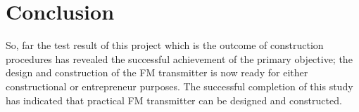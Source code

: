\chapter{Conclusion}

So, far the test result of this project which is the outcome of construction procedures has revealed the successful achievement of the primary objective; the design and construction of the FM transmitter is now ready for either constructional or entrepreneur purposes. The successful completion of this study has indicated that practical  FM transmitter can be designed and constructed. 